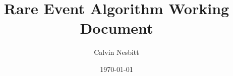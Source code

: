 \documentclass[11pt,a4,oneside]{article}
\title{Rare Event Algorithm Working Document}
\date{\today}
\author{Calvin Nesbitt}
\begin{document}
\maketitle


\tableofcontents
\newpage
{}


\newcommand{\patha}{tex}




\clearpage

 \newcommand{\bibLocation}{/Users/cfn18/Documents/PhD-Work/PhD-Latex-Repository/BibTex-Files} %
\end{document}
